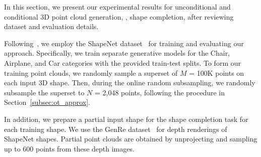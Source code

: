 

In this section, we present our experimental results for unconditional and conditional 3D point cloud generation, \ie, shape completion, 
after reviewing dataset and evaluation details.


Following~\citet{yang2019pointflow,klokov2020discrete,cai2020learning,zhou2021pvd}, 
we employ the ShapeNet dataset~\cite{chang2015shapenet} for training and evaluating our approach. 
%
Specifically, we train separate generative models for the Chair, Airplane, and Car categories with the provided train-test splits.
%
To form our training point clouds, we randomly sample a superset of $M$ = 100K points on 
each input 3D shape.
%
Then, during the online random subsampling, we randomly subsample the superset to 
$N$ = 2,048 points, 
following the procedure in Section~\ref{subsec:ot_approx}.

In addition, we prepare a partial input shape for the shape completion task for each training shape.
%
%
%
We use the GenRe dataset~\cite{zhang2018learning} for depth renderings of ShapeNet shapes. 
%
Partial point clouds are obtained by unprojecting and sampling up to 600 points from these depth images.


